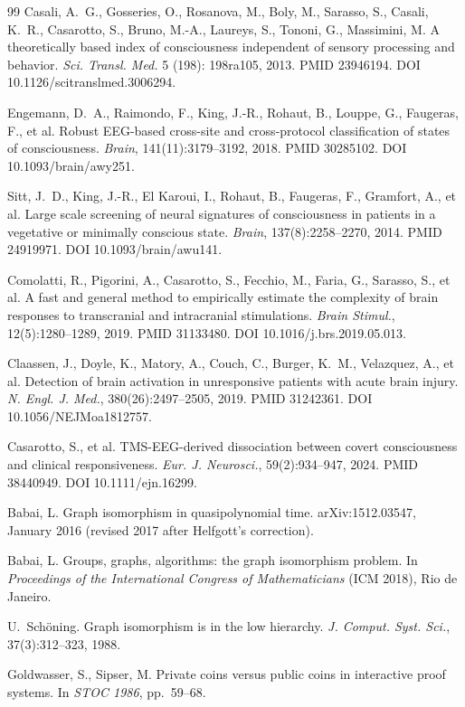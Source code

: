 \documentclass[11pt,a4paper]{amsart}
\theoremstyle{plain}
\theoremstyle{definition}
\begin{document}
\begin{thebibliography}{99}
Casali, A.~G., Gosseries, O., Rosanova, M., Boly, M., Sarasso, S., Casali, K.~R., Casarotto, S., Bruno, M.-A., Laureys, S., Tononi, G., Massimini, M.
\newblock A theoretically based index of consciousness independent of sensory processing and behavior.
\newblock \emph{Sci. Transl. Med.} 5 (198): 198ra105, 2013. PMID 23946194. DOI 10.1126/scitranslmed.3006294.

Engemann, D.~A., Raimondo, F., King, J.-R., Rohaut, B., Louppe, G., Faugeras, F., et al.
\newblock Robust EEG-based cross-site and cross-protocol classification of states of consciousness.
\newblock \emph{Brain}, 141(11):3179--3192, 2018. PMID 30285102. DOI 10.1093/brain/awy251.

Sitt, J.~D., King, J.-R., El Karoui, I., Rohaut, B., Faugeras, F., Gramfort, A., et al.
\newblock Large scale screening of neural signatures of consciousness in patients in a vegetative or minimally conscious state.
\newblock \emph{Brain}, 137(8):2258--2270, 2014. PMID 24919971. DOI 10.1093/brain/awu141.

Comolatti, R., Pigorini, A., Casarotto, S., Fecchio, M., Faria, G., Sarasso, S., et al.
\newblock A fast and general method to empirically estimate the complexity of brain responses to transcranial and intracranial stimulations.
\newblock \emph{Brain Stimul.}, 12(5):1280--1289, 2019. PMID 31133480. DOI 10.1016/j.brs.2019.05.013.

Claassen, J., Doyle, K., Matory, A., Couch, C., Burger, K.~M., Velazquez, A., et al.
\newblock Detection of brain activation in unresponsive patients with acute brain injury.
\newblock \emph{N. Engl. J. Med.}, 380(26):2497--2505, 2019. PMID 31242361. DOI 10.1056/NEJMoa1812757.

Casarotto, S., et al.
\newblock TMS-EEG-derived dissociation between covert consciousness and clinical responsiveness.
\newblock \emph{Eur. J. Neurosci.}, 59(2):934--947, 2024. PMID 38440949. DOI 10.1111/ejn.16299.

Babai, L.
\newblock Graph isomorphism in quasipolynomial time.
\newblock arXiv:1512.03547, January 2016 (revised 2017 after Helfgott's correction).

Babai, L.
\newblock Groups, graphs, algorithms: the graph isomorphism problem.
\newblock In \emph{Proceedings of the International Congress of Mathematicians} (ICM 2018), Rio de Janeiro.

U.~Sch\"oning.
\newblock Graph isomorphism is in the low hierarchy.
\newblock \emph{J. Comput. Syst. Sci.}, 37(3):312--323, 1988.

Goldwasser, S., Sipser, M.
\newblock Private coins versus public coins in interactive proof systems.
\newblock In \emph{STOC 1986}, pp.~59--68.

\end{thebibliography}
\end{document}
